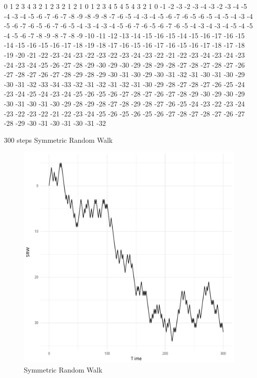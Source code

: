 \documentclass{article}
\begin{document}
\begin{table}[h]
0 1 2 3 4 3 2 1 2 3 2 1 2 1 0 1 2 3 4 5 4 5 4 3 2 1 0 -1 -2 -3 -2 -3 -4 -3 -2 -3 -4 -5 -4 -3 -4 -5 -6 -7 -6 -7 -8 -9 -8 -9 -8 -7 -6 -5 -4 -3 -4 -5 -6 -7 -6 -5 -6 -5 -4 -5 -4 -3 -4 -5 -6 -7 -6 -5 -6 -7 -6 -5 -4 -3 -4 -3 -4 -5 -6 -7 -6 -5 -6 -7 -6 -5 -4 -3 -4 -3 -4 -5 -4 -5 -4 -5 -6 -7 -8 -9 -8 -7 -8 -9 -10 -11 -12 -13 -14 -15 -16 -15 -14 -15 -16 -17 -16 -15 -14 -15 -16 -15 -16 -17 -18 -19 -18 -17 -16 -15 -16 -17 -16 -15 -16 -17 -18 -17 -18 -19 -20 -21 -22 -23 -24 -23 -22 -23 -22 -23 -24 -23 -22 -21 -22 -23 -24 -23 -24 -23 -24 -23 -24 -25 -26 -27 -28 -29 -30 -29 -30 -29 -28 -29 -28 -27 -28 -27 -28 -27 -26 -27 -28 -27 -26 -27 -28 -29 -28 -29 -30 -31 -30 -29 -30 -31 -32 -31 -30 -31 -30 -29 -30 -31 -32 -33 -34 -33 -32 -31 -32 -31 -32 -31 -30 -29 -28 -27 -28 -27 -26 -25 -24 -23 -24 -25 -24 -23 -24 -25 -26 -25 -26 -27 -28 -27 -26 -27 -28 -29 -30 -29 -30 -29 -30 -31 -30 -31 -30 -29 -28 -29 -28 -27 -28 -29 -28 -27 -26 -25 -24 -23 -22 -23 -24 -23 -22 -23 -22 -21 -22 -23 -24 -25 -26 -25 -26 -25 -26 -27 -28 -27 -28 -27 -26 -27 -28 -29 -30 -31 -30 -31 -30 -31 -32\caption{300 steps Symmetric Random Walk}
\end{table}


\begin{figure}[!h]
\begin{center}


\includegraphics[width=1.0\textwidth]{SRW.pdf}

\end{center}
\caption{Symmetric Random Walk}
\end{figure}
\end{document}
